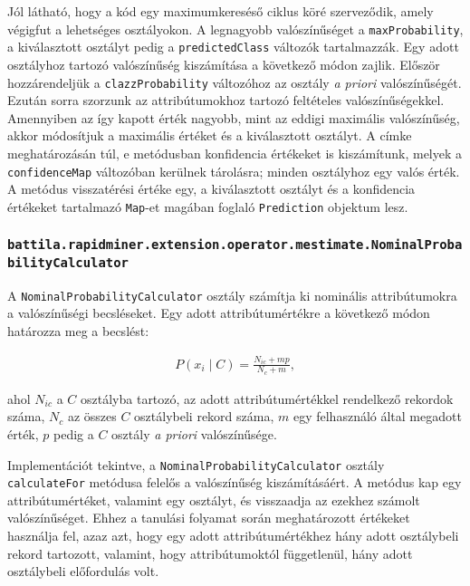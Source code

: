 \documentclass[a4paper]{article}
\begin{document}
Jól látható, hogy a kód egy maximumkereséső ciklus köré szerveződik, amely végigfut a lehetséges osztályokon. A legnagyobb valószínűséget a \texttt{maxProbability}, a kiválasztott osztályt pedig a \texttt{predictedClass} változók tartalmazzák. Egy adott osztályhoz tartozó valószínűség kiszámítása a következő módon zajlik. Először hozzárendeljük a \texttt{clazzProbability} változóhoz az osztály \textit{a priori} valószínűségét. Ezután sorra szorzunk az attribútumokhoz tartozó feltételes valószínűségekkel. Amennyiben az így kapott érték nagyobb, mint az eddigi maximális valószínűség, akkor módosítjuk a maximális értéket és a kiválasztott osztályt.
A címke meghatározásán túl, e metódusban konfidencia értékeket is kiszámítunk, melyek a \texttt{confidenceMap} változóban kerülnek tárolásra; minden osztályhoz egy valós érték. 
A metódus visszatérési értéke egy, a kiválasztott osztályt és a konfidencia értékeket tartalmazó \texttt{Map}-et magában foglaló \texttt{Prediction} objektum lesz.

\subsubsection{\texttt{battila.rapidminer.extension.operator.mestimate.NominalProbabilityCalculator}}

A \texttt{NominalProbabilityCalculator} osztály számítja ki nominális attribútumokra a valószínűségi becsléseket. Egy adott attribútumértékre a következő módon határozza meg a becslést:

\begin{align*}
P(x_i \; | \; C) = \frac{N_{ic} + mp}{N_{c} + m},
\end{align*}

ahol $N_{ic}$ a $C$ osztályba tartozó, az adott attribútumértékkel rendelkező rekordok száma, $N_{c}$ az összes $C$ osztálybeli rekord száma, $m$ egy felhasználó által megadott érték, $p$ pedig a $C$ osztály \textit{a priori} valószínűsége.

Implementációt tekintve, a \texttt{NominalProbabilityCalculator} osztály \texttt{calculateFor} metódusa felelős a valószínűség kiszámításáért. A metódus kap egy attribútumértéket, valamint egy osztályt, és visszaadja az ezekhez számolt valószínűséget. Ehhez a tanulási folyamat során meghatározott értékeket használja fel, azaz azt, hogy egy adott attribútumértékhez hány adott osztálybeli rekord tartozott, valamint, hogy attribútumoktól függetlenül, hány adott osztálybeli előfordulás volt.

\pagebreak
\end{document}
